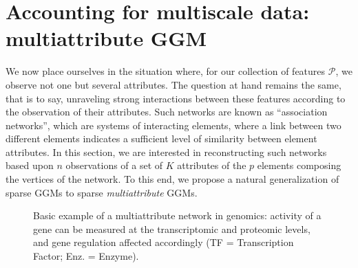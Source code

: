 \section{Accounting for multiscale data: multiattribute GGM}
\label{sec:multiattribute_ggm}

We now place  ourselves in the situation where, for  our collection of
features $\mathcal{P}$, we observe not one but several attributes. The
question at hand  remains the same, that is to  say, unraveling strong
interactions between  these features  according to the  observation of
their   attributes.   Such   networks  are   known  as   ``association
networks'', which  are systems of  interacting elements, where  a link
between  two  different  elements  indicates  a  sufficient  level  of
similarity  between  element  attributes.   In this  section,  we  are
interested in reconstructing such networks based upon $n$ observations
of a set of $K$ attributes  of the $p$ elements composing the vertices
of the  network. To this end,  we propose a natural  generalization of
sparse GGMs to sparse \emph{multiattribute} GGMs.

\begin{figure}[htbp!]
  \centering
  \caption{Basic example of a multiattribute network in genomics:
    activity of a gene can be measured at the transcriptomic and
    proteomic levels, and gene regulation affected accordingly (TF =
    Transcription Factor; Enz. = Enzyme).}
\label{fig:central_dogma}
\end{figure}

